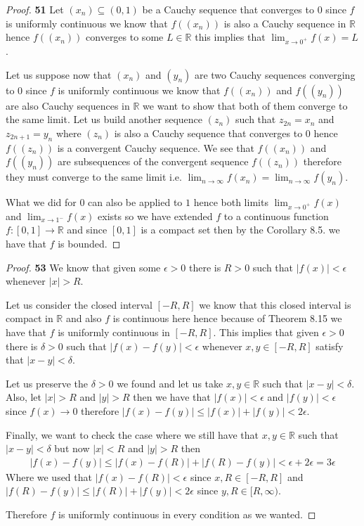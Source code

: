 \documentclass[11pt]{article}
\newcommand{\R}{\mathbb{R}}
\theoremstyle{definition}
\begin{document}
    \begin{proof}{\textbf{51}}
        Let $(x_n) \subseteq (0,1)$ be a Cauchy sequence that converges to $0$
        since $f$ is uniformly continuous we know that $f((x_n))$ is also a
        Cauchy sequence in $\R$ hence $f((x_n))$ converges to some $L \in \R$
        this implies that $\lim_{x\to 0^+}f(x) = L$.

        Let us suppose now that $(x_n)$ and $(y_n)$ are two Cauchy sequences
        converging to $0$ since $f$ is uniformly continuous we know that
        $f((x_n))$ and $f((y_n))$ are also Cauchy sequences in $\R$ 
        we want to show that both of them converge to the same limit.
        Let us build another sequence $(z_n)$ such that
        $z_{2n} = x_n$ and $z_{2n + 1} = y_n$ where $(z_n)$ is also a Cauchy
        sequence that converges to $0$ hence $f((z_n))$ is a convergent
        Cauchy sequence.
        We see that $f((x_n))$ and $f((y_n))$ are subsequences of the
        convergent sequence $f((z_n))$ therefore they must converge to the same
        limit i.e. $\lim_{n\to \infty} f(x_n) = \lim_{n\to \infty} f(y_n)$.

        What we did for $0$ can also be applied to $1$ hence both limits
        $\lim_{x\to 0^+}f(x)$ and $\lim_{x\to 1^-}f(x)$ exists so we have
        extended $f$ to a continuous function $f:[0,1] \to \R$ and since
        $[0,1]$ is a compact set then by the Corollary 8.5. we have that
        $f$ is bounded.
    \end{proof}
    \cleardoublepage
    \begin{proof}{\textbf{53}}
        We know that given some $\epsilon > 0$ there is $R > 0$ such that
        $|f(x)| < \epsilon$ whenever $|x| > R$.

        Let us consider the closed interval $[-R, R]$ we know that this
        closed interval is compact in $\R$ and also $f$ is continuous here
        hence because of Theorem 8.15 we have that $f$ is uniformly continuous
        in $[-R, R]$.
        This implies that given $\epsilon > 0$ there is
        $\delta > 0$ such that $|f(x) - f(y)| < \epsilon$ whenever
        $x,y \in [-R, R]$ satisfy that $|x - y|< \delta$.

        Let us preserve the $\delta > 0$ we found and let us take
        $x,y \in \R$ such that $|x - y|< \delta$. Also, let $|x|> R$ and
        $|y| > R$ then we have that $|f(x)| < \epsilon$ and $|f(y)| < \epsilon$
        since $f(x) \to 0$ therefore
        $|f(x) - f(y)| \leq |f(x)| + |f(y)| < 2\epsilon$.

        Finally, we want to check the case where we still have that
        $x,y \in \R$ such that $|x - y|< \delta$ but now $|x| < R$ and
        $|y| > R$ then
        \begin{align*}
            |f(x) - f(y)| \leq |f(x) - f(R)| + |f(R) - f(y)|
            < \epsilon + 2\epsilon = 3\epsilon
        \end{align*}
        Where we used that $|f(x) - f(R)| < \epsilon$ since $x,R \in [-R, R]$
        and $|f(R) - f(y)| \leq |f(R)| + |f(y)| < 2\epsilon$ since
        $y,R \in [R, \infty)$.
        
        Therefore $f$ is uniformly continuous in every condition as we wanted.
    \end{proof}
\end{document}
